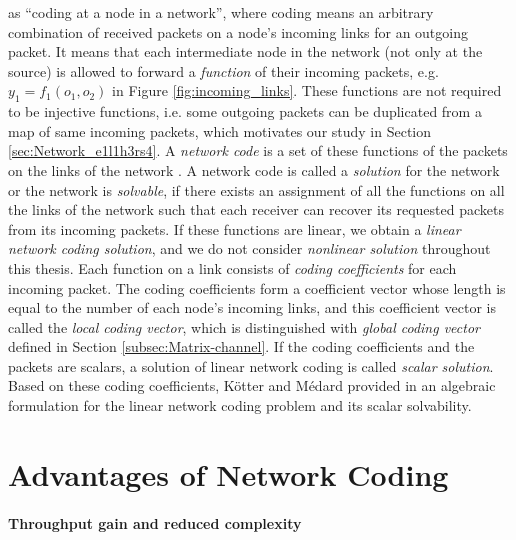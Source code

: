 \cite{Ahlswede:2000} as ``coding at a node in a network'', where
coding means an arbitrary combination of received packets on a node's
incoming links for an outgoing packet. It means that each intermediate
node in the network (not only at the source) is allowed to forward
a \textit{function} of their incoming packets, e.g. $y_{1}=f_{1}(o_{1},o_{2})$
in Figure \ref{fig:incoming_links}. These functions are not required
to be injective functions, i.e. some outgoing packets can be duplicated
from a map of same incoming packets, which motivates our study in
Section \ref{sec:Network_e1l1h3rs4}. A \textit{network code} is a
set of these functions of the packets on the links of the network
\cite{Wachter-Zeh:2018}. A network code is called a \textit{solution}
for the network or the network is \textit{solvable}, if there exists
an assignment of all the functions on all the links of the network
such that each receiver can recover its requested packets from its
incoming packets. If these functions are linear, we obtain a \textit{linear
network coding solution}, and we do not consider \textit{nonlinear
solution} throughout this thesis. Each function on a link consists
of \textit{coding coefficients} for each incoming packet. The coding
coefficients form a coefficient vector whose length is equal to the
number of each node's incoming links, and this coefficient vector
is called the \textit{local coding vector}, which is distinguished
with \textit{global coding vector} defined in Section \ref{subsec:Matrix-channel}.
If the coding coefficients and the packets are scalars, a solution
of linear network coding is called \textit{scalar solution}. Based
on these coding coefficients, K\"otter and M\'edard provided in
\cite{Koetter:2003} an algebraic formulation for the linear network
coding problem and its scalar solvability.

\section{Advantages of Network Coding \label{sec:Advantages-of-NC}}

\paragraph{Throughput gain and reduced complexity}

